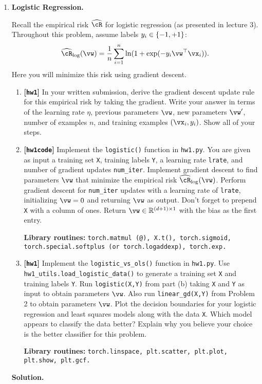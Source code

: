 \documentclass{article}
\def\R{\mathbb{R}}
\def\hcR{\widehat{\cR}}
\def\hw{\textbf{[\texttt{hw1}]}\xspace}
\def\hwcode{\textbf{[\texttt{hw1code}]}\xspace}
\theoremstyle{definition}
\theoremstyle{remark}
\newenvironment{Q}
{%
  \clearpage
  \item
  }
  {%
    \phantom{s} %
    \bigskip
    \textbf{Solution.}
  }
\begin{document}
\begin{enumerate}[font={\Large\bfseries},left=0pt]
    \begin{Q}
  \textbf{\Large Logistic Regression.}

  Recall the empirical risk $\hcR$ for logistic regression (as presented in lecture 3). Throughout this problem, assume labels $y_i \in \cbr{-1,+1}$:
  \begin{align*}
  \hcR_{\log}(\vw) = \frac{1}{n} \sum_{i=1}^n \ln ( 1 + \exp( - y_i \vw^\top \vx_i ) ).
  \end{align*}
  Here you will minimize this risk using gradient descent.
  \begin{enumerate}
  \item \hw In your written submission, derive the gradient descent update rule for this empirical risk by taking the gradient.  Write your answer in terms of the learning rate $\eta$, previous parameters $\vw$, new parameters $\vw'$, number of examples $n$, and training examples $(\vx_i, y_i)$.  Show all of your steps.
  \item \hwcode Implement the \texttt{logistic()} function in \texttt{hw1.py}.  You are given as input a training set \texttt{X}, training labels \texttt{Y}, a learning rate \texttt{lrate}, and number of gradient updates \texttt{num\_iter}.  Implement gradient descent to find parameters $\vw$ that minimize the empirical risk $\hcR_{\log}(\vw)$. Perform gradient descent for \texttt{num\_iter} updates with a learning rate of \texttt{lrate}, initializing $\vw = 0$ and returning $\vw$ as output. Don't forget to prepend \texttt{X} with a column of ones. Return $\vw \in \R^{(d+1)\times 1}$ with the bias as the first entry.
  
  \textbf{Library routines:} \texttt{torch.matmul (@), X.t(), torch.sigmoid, torch.special.softplus (or torch.logaddexp), torch.exp.}
  
  \item \hw Implement the \texttt{logistic\_vs\_ols()} function in \texttt{hw1.py}. Use \texttt{hw1\_utils.load\_logistic\_data()} to generate a training set \texttt{X} and training labels \texttt{Y}.  Run \texttt{logistic(X,Y)} from part (b) taking \texttt{X} and \texttt{Y} as input to obtain parameters $\vw$.  Also run \texttt{linear\_gd(X,Y)} from Problem 2 to obtain parameters $\vw$.  Plot the decision boundaries for your logistic regression and least squares models along with the data \texttt{X}. Which model appears to classify the data better? Explain why you believe your choice is the better classifier for this problem.
  
  \textbf{Library routines:} \texttt{torch.linspace, plt.scatter, plt.plot, plt.show, plt.gcf.}
  

\end{enumerate}
\end{Q}
\end{enumerate}
\end{document}
